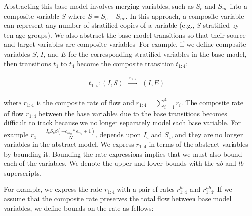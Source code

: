 Abstracting this base model involves merging variables, such as $S_c$ and $S_{nc}$ into a composite variable $S$ where $S = S_c + S_{nc}$.  In this approach, a composite variable can represent any number of stratified copies of a variable (e.g., $S$ stratified by ten age groups). We also abstract the base model transitions so that their source and target variables are composite variables.  For example, if we define composite variables $S$, $I$, and $E$ for the corresponding stratified variables in the base model, then transitions $t_1$ to $t_4$ become the composite transition $t_{1:4}$:

\begin{eqnarray*}
    t_{1:4}:(I, S) &\xrightarrow[]{r_{1:4}}& (I, E)
\end{eqnarray*}

\noindent where $r_{1:4}$ is the composite rate of flow and $r_{1:4} = \sum_{i=1}^4 r_i$.  The composite rate of flow $r_{1:4}$ between the base variables due to the base transitions becomes difficult to track because we no longer separately model each base variable.  For example $r_1 = \frac{I_c S_c \beta(-c_{m_0}*\epsilon_{m_0} + 1)}{N}$, depends upon $I_c$ and $S_c$, and they are no longer variables in the abstract model.  We express $r_{1:4}$ in terms of the abstract variables by bounding it.  Bounding the rate expressions implies that we must also bound each of the variables.  We denote the upper and lower bounds with the $ub$ and $lb$ superscripts. 

For example, we express the rate $r_{1:4}$ with a pair of rates $r^{lb}_{1:4}$ and $r^{ub}_{1:4}$.  If we assume that the composite rate preserves the total flow between base model variables, we define bounds on the rate as follows: 

